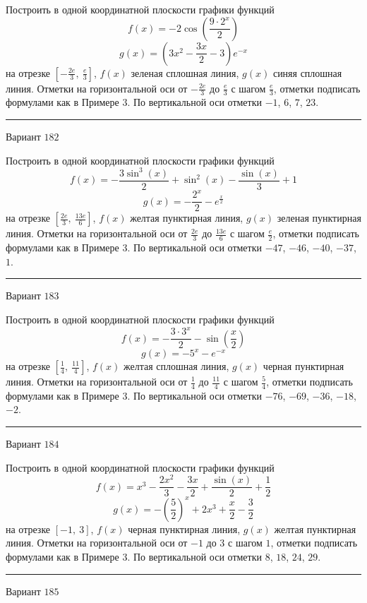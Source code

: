 \documentclass[11pt]{report}
\begin{document}
Построить в одной координатной плоскости графики функций $$f(x) = - 2 \cos{\left(\frac{9 \cdot 2^{x}}{2} \right)}$$ $$g(x) = \left(3 x^{2} - \frac{3 x}{2} - 3\right) e^{- x}$$ на отрезке $\left[- \frac{2 e}{3}, \  \frac{e}{3}\right]$, $f(x)$ зеленая сплошная линия, $g(x)$ синяя сплошная линия. Отметки на горизонтальной оси от $- \frac{2 e}{3}$ до $\frac{e}{3}$ с шагом $\frac{e}{3}$, отметки подписать формулами как в Примере 3. По вертикальной оси отметки $-1$, $6$, $7$, $23$.
\begin{center}
\noindent\rule{8cm}{0.4pt}
\end{center}
Вариант $182$


Построить в одной координатной плоскости графики функций $$f(x) = - \frac{3 \sin^{3}{\left(x \right)}}{2} + \sin^{2}{\left(x \right)} - \frac{\sin{\left(x \right)}}{3} + 1$$ $$g(x) = - \frac{2^{x}}{2} - e^{\frac{x}{2}}$$ на отрезке $\left[\frac{2 e}{3}, \  \frac{13 e}{6}\right]$, $f(x)$ желтая пунктирная линия, $g(x)$ зеленая пунктирная линия. Отметки на горизонтальной оси от $\frac{2 e}{3}$ до $\frac{13 e}{6}$ с шагом $\frac{e}{2}$, отметки подписать формулами как в Примере 3. По вертикальной оси отметки $-47$, $-46$, $-40$, $-37$, $1$.
\begin{center}
\noindent\rule{8cm}{0.4pt}
\end{center}
Вариант $183$


Построить в одной координатной плоскости графики функций $$f(x) = - \frac{3 \cdot 3^{x}}{2} - \sin{\left(\frac{x}{2} \right)}$$ $$g(x) = - 5^{x} - e^{- x}$$ на отрезке $\left[\frac{1}{4}, \  \frac{11}{4}\right]$, $f(x)$ желтая сплошная линия, $g(x)$ черная пунктирная линия. Отметки на горизонтальной оси от $\frac{1}{4}$ до $\frac{11}{4}$ с шагом $\frac{5}{4}$, отметки подписать формулами как в Примере 3. По вертикальной оси отметки $-76$, $-69$, $-36$, $-18$, $-2$.
\begin{center}
\noindent\rule{8cm}{0.4pt}
\end{center}
Вариант $184$


Построить в одной координатной плоскости графики функций $$f(x) = x^{3} - \frac{2 x^{2}}{3} - \frac{3 x}{2} + \frac{\sin{\left(x \right)}}{2} + \frac{1}{2}$$ $$g(x) = - \left(\frac{5}{2}\right)^{x} + 2 x^{3} + \frac{x}{2} - \frac{3}{2}$$ на отрезке $\left[-1, \  3\right]$, $f(x)$ черная пунктирная линия, $g(x)$ желтая пунктирная линия. Отметки на горизонтальной оси от $-1$ до $3$ с шагом $1$, отметки подписать формулами как в Примере 3. По вертикальной оси отметки $8$, $18$, $24$, $29$.
\begin{center}
\noindent\rule{8cm}{0.4pt}
\end{center}
Вариант $185$
\end{document}

